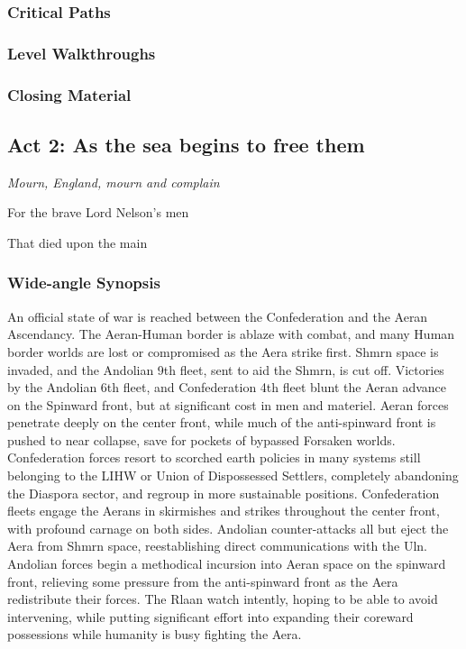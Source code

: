 \subsubsection{Critical Paths}
\subsubsection{Level Walkthroughs}
\subsubsection{Closing Material}

\subsection{Act 2: As the sea begins to free them}
\begin{center}
{\it Mourn, England, mourn and complain

For the brave Lord Nelson's men

That died upon the main}
\end{center}
\subsubsection{Wide-angle Synopsis}
An official state of war is reached between the Confederation and the
Aeran Ascendancy. The Aeran-Human border is ablaze with combat, and
many Human border worlds are lost or compromised as the Aera strike
first. Shmrn space is invaded, and the Andolian 9th fleet, sent to aid
the Shmrn, is cut off. Victories by the Andolian 6th fleet, and
Confederation 4th fleet blunt the Aeran advance on the Spinward front,
but at significant cost in men and materiel. Aeran forces penetrate
deeply on the center front, while much of the anti-spinward front is
pushed to near collapse, save for pockets of bypassed Forsaken
worlds. Confederation forces resort to scorched earth policies in many
systems still belonging to the LIHW or Union of Dispossessed Settlers,
completely abandoning the Diaspora sector, and regroup in more
sustainable positions. Confederation fleets engage the Aerans in
skirmishes and strikes throughout the center front, with profound
carnage on both sides. Andolian counter-attacks all but eject the Aera
from Shmrn space, reestablishing direct communications with the
Uln. Andolian forces begin a methodical incursion into Aeran space on
the spinward front, relieving some pressure from the anti-spinward
front as the Aera redistribute their forces. The Rlaan watch intently,
hoping to be able to avoid intervening, while putting significant
effort into expanding their coreward possessions while humanity is busy
fighting the Aera.
